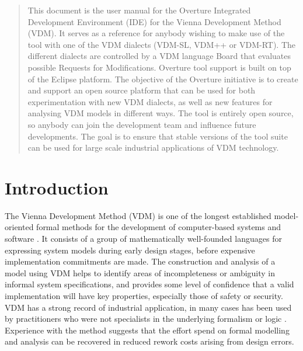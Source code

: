 \documentclass{overturerepchap}
\begin{document}
\begin{abstract}
This document is the user manual for the Overture Integrated Development
Environment (IDE) for the Vienna Development Method
(VDM). It serves as a reference for anybody wishing to make use of
the tool with one of the VDM dialects (VDM-SL, VDM++ or VDM-RT). 
The different dialects are controlled by a VDM language Board that 
evaluates possible Requests for Modifications.
Overture tool support is built on top of the Eclipse platform. The
objective of the Overture initiative is to create and support an open source
platform that can be used for both experimentation with new VDM dialects,
as well as new features for analysing VDM
models in different ways. The tool is entirely open source, so anybody
can join the development team and influence future
developments. The goal is to ensure that stable
versions of the tool suite can be used for large scale industrial
applications of VDM technology.
\end{abstract}

\chapter{Introduction}

The Vienna Development Method (VDM) is one of the longest established
model-oriented formal methods for the development of computer-based
systems and software
\cite{Bjorner&78,Jones90a,Fitzgerald&08c}. It consists of a
group of mathematically well-founded languages for expressing system
models during early design stages, before expensive implementation
commitments are made. The construction and analysis of a model using
VDM helps to identify areas of incompleteness or ambiguity in
informal system specifications, and provides some level of confidence
that a valid implementation will have key properties, especially those
of safety or security. VDM has a strong record of industrial
application, in many cases has been used
by practitioners who were not specialists in
the underlying formalism or logic
\cite{Larsen&96b,Clement&99,Kurita&09}. Experience with the method
suggests that the effort spend on formal modelling and analysis can
be recovered in reduced rework costs arising from design errors.
\end{document}
